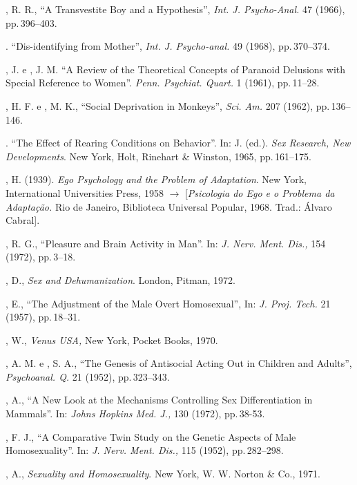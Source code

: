 \begin{bibliohedra}
, R. R., ``A Transvestite Boy and a
Hypothesis'', \textit{Int. J. Psycho-Anal. } 47 (1966), pp.\,396--403.

. ``Dis-identifying from Mother'',
\textit{ Int. J. Psycho-anal. } 49 (1968), pp.\,370--374.

, J. e , J. M. ``A Review of the Theoretical
Concepts of Paranoid Delusions with Special Reference to Women''.
\textit{ Penn. Psychiat. Quart. } 1 (1961), pp.\,11--28.

, H. F. e , M. K., ``Social Deprivation in
Monkeys'', \textit{Sci. Am. } 207 (1962), pp.\,136--146.

. ``The Effect of Rearing Conditions on
Behavior''. In:  J. (ed.). \textit{Sex Research, 
New Developments}. New York, Holt, Rinehart \& Winston, 1965, pp.\,161--175.

, H. (1939). \textit{Ego Psychology and the Problem of Adaptation}. New
York, International Universities Press, 1958 {$\bm{\rightarrow}$} [\textit{Psicologia do Ego e o
Problema da Adaptação. }Rio de Janeiro, Biblioteca Universal Popular, 1968. Trad.:
Álvaro Cabral].

, R. G., ``Pleasure and Brain Activity in Man''. In: 
\textit{J. Nerv. Ment. Dis., } 154 (1972), pp.\,3--18.

, D., \textit{Sex and Dehumanization}. London, Pitman, 1972.

, E., ``The Adjustment of the Male Overt
Homosexual'', In: \textit{ J. Proj. Tech. }21 (1957), pp.\,18--31.

, W., \textit{Venus USA, }New York, Pocket Books, 1970.

, A. M. e , S. A., ``The Genesis of Antisocial Acting
Out in Children and Adults'', \textit{Psychoanal. Q. }21 (1952), pp.\,323--343.

, A., ``A New Look at the Mechanisms Controlling Sex
Differentiation in Mammals''. In: \textit{Johns Hopkins Med. J., }130
(1972), pp.\,38-53.

, F. J., ``A Comparative Twin Study on the Genetic Aspects
of Male Homosexuality''. In: \textit{J. Nerv. Ment. Dis., }115 (1952),
pp.\,282--298.

, A., \textit{Sexuality and Homosexuality}. New York, W. W. Norton \&
Co., 1971.


\end{bibliohedra}
